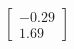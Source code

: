 \documentclass[preview]{standalone}
\begin{document}
\begin{align*}
\begin{bmatrix} -0.29 \\ 1.69 \end{bmatrix}
\end{align*}
\end{document}
